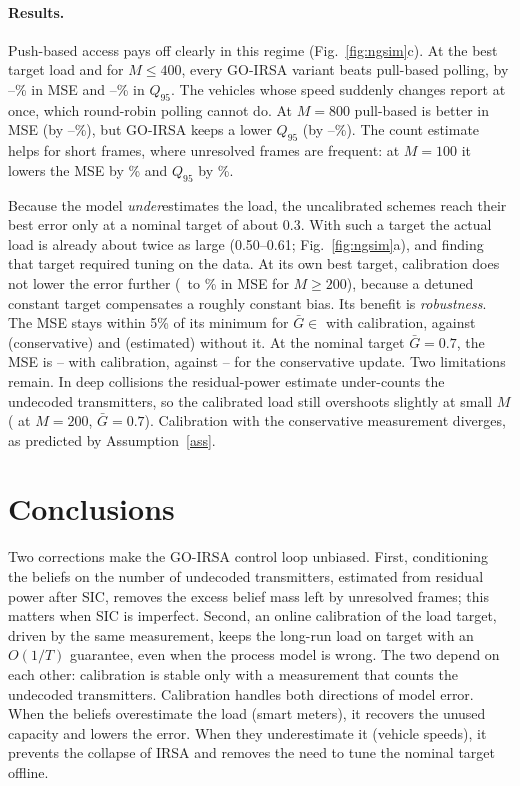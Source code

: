 \documentclass[10pt]{article}
\theoremstyle{remark}
\theoremstyle{definition}
\newcommand{\Gb}{\bar G}
\begin{document}
\paragraph{Results.} Push-based access pays off clearly in this regime (Fig.~\ref{fig:ngsim}c).
At the best target load and for $M\le400$, every GO-IRSA variant beats pull-based polling, by
\ngVsPullMseMin--\ngVsPullMseMax\% in MSE and \ngVsPullQMin--\ngVsPullQMax\% in $Q_{95}$. The
vehicles whose speed suddenly changes report at once, which round-robin polling cannot do. At $M=800$ pull-based
is better in MSE (by \ngPullBetterMseMin--\ngPullBetterMseMax\%), but GO-IRSA keeps a lower
$Q_{95}$ (by \ngVsPullQEightMin--\ngVsPullQEightMax\%). The count estimate helps for short frames,
where unresolved frames are frequent: at $M=100$ it lowers the MSE by \ngEstGainMseHundred\% and $Q_{95}$ by
\ngEstGainQHundred\%.

Because the model \emph{under}estimates the load, the uncalibrated schemes reach their best
error only at a nominal target of about 0.3. With such a target the actual load is already about twice as
large (0.50--0.61; Fig.~\ref{fig:ngsim}a), and finding that target required tuning on the data. At its own best
target, calibration does not lower the error further (\ngCalGainMseMin\ to \ngCalGainMseMax\% in MSE for $M\ge200$),
because a detuned constant target compensates a roughly constant bias. Its benefit is
\emph{robustness}. The MSE stays within 5\% of its minimum for $\Gb\in$ \ngWinEstc{} with
calibration, against \ngWinCons{} (conservative) and \ngWinEst{} (estimated) without it. At the
nominal target $\Gb=0.7$, the MSE is \ngMseSevenEstcMin--\ngMseSevenEstcMax{} with calibration,
against \ngMseSevenConsMin--\ngMseSevenConsMax{} for the conservative update. Two limitations remain.
In deep collisions the residual-power estimate under-counts the undecoded transmitters, so the
calibrated load still overshoots slightly at small $M$ (\ngLoadEstc{} at $M=200$, $\Gb=0.7$).
Calibration with the conservative measurement diverges, as predicted by Assumption~\ref{ass}.

\section{Conclusions}
Two corrections make the GO-IRSA control loop unbiased. First, conditioning the beliefs on the number
of undecoded transmitters, estimated from residual power after SIC, removes the excess
belief mass left by unresolved frames; this matters when SIC is imperfect. Second, an online
calibration of the load target, driven by the same measurement, keeps the long-run load on
target with an $O(1/T)$ guarantee, even when the process model is wrong. The two depend on each
other: calibration is stable only with a measurement that counts the undecoded transmitters.
Calibration handles both directions of model error. When the beliefs overestimate the load (smart
meters), it recovers the unused capacity and lowers the error. When they underestimate it (vehicle
speeds), it prevents the collapse of IRSA and removes the need to tune the nominal target offline.
\end{document}
